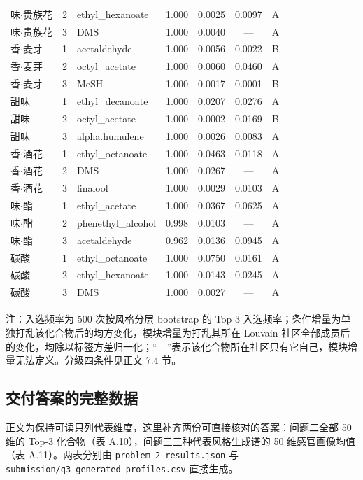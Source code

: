 \documentclass[zihao=-4,a4paper,UTF8,fontset=none]{ctexart}
\begin{document}
\begin{longtable}{@{}p{1.9cm}cp{4.2cm}cccc@{}}
味$\cdot$贵族花 & 2 & ethyl\_hexanoate & 1.000 & 0.0025 & 0.0097 & A \\
味$\cdot$贵族花 & 3 & DMS & 1.000 & 0.0040 & --- & A \\
香$\cdot$麦芽 & 1 & acetaldehyde & 1.000 & 0.0056 & 0.0022 & B \\
香$\cdot$麦芽 & 2 & octyl\_acetate & 1.000 & 0.0060 & 0.0460 & A \\
香$\cdot$麦芽 & 3 & MeSH & 1.000 & 0.0017 & 0.0001 & B \\
甜味 & 1 & ethyl\_decanoate & 1.000 & 0.0207 & 0.0276 & A \\
甜味 & 2 & octyl\_acetate & 1.000 & 0.0002 & 0.0169 & B \\
甜味 & 3 & alpha.humulene & 1.000 & 0.0026 & 0.0083 & A \\
香$\cdot$酒花 & 1 & ethyl\_octanoate & 1.000 & 0.0463 & 0.0118 & A \\
香$\cdot$酒花 & 2 & DMS & 1.000 & 0.0267 & --- & A \\
香$\cdot$酒花 & 3 & linalool & 1.000 & 0.0029 & 0.0103 & A \\
味$\cdot$酯 & 1 & ethyl\_acetate & 1.000 & 0.0367 & 0.0625 & A \\
味$\cdot$酯 & 2 & phenethyl\_alcohol & 0.998 & 0.0103 & --- & A \\
味$\cdot$酯 & 3 & acetaldehyde & 0.962 & 0.0136 & 0.0945 & A \\
碳酸 & 1 & ethyl\_octanoate & 1.000 & 0.0750 & 0.0161 & A \\
碳酸 & 2 & ethyl\_hexanoate & 1.000 & 0.0143 & 0.0245 & A \\
碳酸 & 3 & DMS & 1.000 & 0.0027 & --- & A \\
\end{longtable}

\noindent\footnotesize 注：入选频率为 500 次按风格分层 bootstrap 的 Top-3 入选频率；条件增量为单独打乱该化合物后的均方变化，模块增量为打乱其所在 Louvain 社区全部成员后的变化，均除以标签方差归一化；“---”表示该化合物所在社区只有它自己，模块增量无法定义。分级四条件见正文 7.4 节。



\subsection{交付答案的完整数据}

正文为保持可读只列代表维度，这里补齐两份可直接核对的答案：问题二全部 50 维的 Top-3 化合物（表 A.10），问题三三种代表风格生成谱的 50 维感官画像均值（表 A.11）。两表分别由 \texttt{problem\_2\_results.json} 与 \texttt{submission/\allowbreak{}q3\_generated\_profiles.csv} 直接生成。
\end{document}
